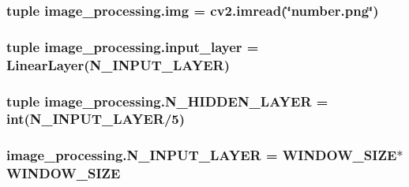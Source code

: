 \hypertarget{namespaceimage__processing_a714ff6403e956fcb6206b9422e3811f6}{
\subsubsection[{img}]{\setlength{\rightskip}{0pt plus 5cm}tuple image\-\_\-processing.\-img = cv2.\-imread(\char`\"{}number.\-png\char`\"{})}}\label{namespaceimage__processing_a714ff6403e956fcb6206b9422e3811f6}
\hypertarget{namespaceimage__processing_a7ca15ee314d3685ae47fe44112267e34}{
\subsubsection[{input\-\_\-layer}]{\setlength{\rightskip}{0pt plus 5cm}tuple image\-\_\-processing.\-input\-\_\-layer = Linear\-Layer({\bf N\-\_\-\-I\-N\-P\-U\-T\-\_\-\-L\-A\-Y\-E\-R})}}\label{namespaceimage__processing_a7ca15ee314d3685ae47fe44112267e34}
\hypertarget{namespaceimage__processing_a39da60bdb74b1baaab3a1aa51d225d78}{
\subsubsection[{N\-\_\-\-H\-I\-D\-D\-E\-N\-\_\-\-L\-A\-Y\-E\-R}]{\setlength{\rightskip}{0pt plus 5cm}tuple image\-\_\-processing.\-N\-\_\-\-H\-I\-D\-D\-E\-N\-\_\-\-L\-A\-Y\-E\-R = int({\bf N\-\_\-\-I\-N\-P\-U\-T\-\_\-\-L\-A\-Y\-E\-R}/5)}}\label{namespaceimage__processing_a39da60bdb74b1baaab3a1aa51d225d78}
\hypertarget{namespaceimage__processing_a7573378d6f95349bc79dff9f973e57b0}{
\subsubsection[{N\-\_\-\-I\-N\-P\-U\-T\-\_\-\-L\-A\-Y\-E\-R}]{\setlength{\rightskip}{0pt plus 5cm}image\-\_\-processing.\-N\-\_\-\-I\-N\-P\-U\-T\-\_\-\-L\-A\-Y\-E\-R = {\bf W\-I\-N\-D\-O\-W\-\_\-\-S\-I\-Z\-E}$\ast${\bf W\-I\-N\-D\-O\-W\-\_\-\-S\-I\-Z\-E}}}\label{namespaceimage__processing_a7573378d6f95349bc79dff9f973e57b0}
